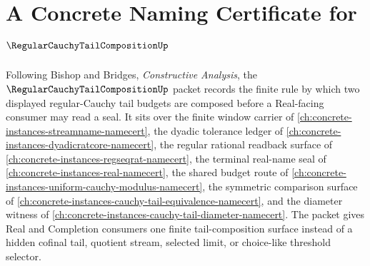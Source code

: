 \chapter{A Concrete Naming Certificate for $\RegularCauchyTailCompositionUp$}
\label{ch:concrete-instances-regular-cauchy-tail-composition-namecert}

Following Bishop and Bridges, \emph{Constructive Analysis}, the $\RegularCauchyTailCompositionUp$ packet records the finite rule by which two displayed regular-Cauchy tail budgets are composed before a Real-facing consumer may read a seal. It sits over the finite window carrier of \autoref{ch:concrete-instances-streamname-namecert}, the dyadic tolerance ledger of \autoref{ch:concrete-instances-dyadicratcore-namecert}, the regular rational readback surface of \autoref{ch:concrete-instances-regseqrat-namecert}, the terminal real-name seal of \autoref{ch:concrete-instances-real-namecert}, the shared budget route of \autoref{ch:concrete-instances-uniform-cauchy-modulus-namecert}, the symmetric comparison surface of \autoref{ch:concrete-instances-cauchy-tail-equivalence-namecert}, and the diameter witness of \autoref{ch:concrete-instances-cauchy-tail-diameter-namecert}. The packet gives Real and Completion consumers one finite tail-composition surface instead of a hidden cofinal tail, quotient stream, selected limit, or choice-like threshold selector.

